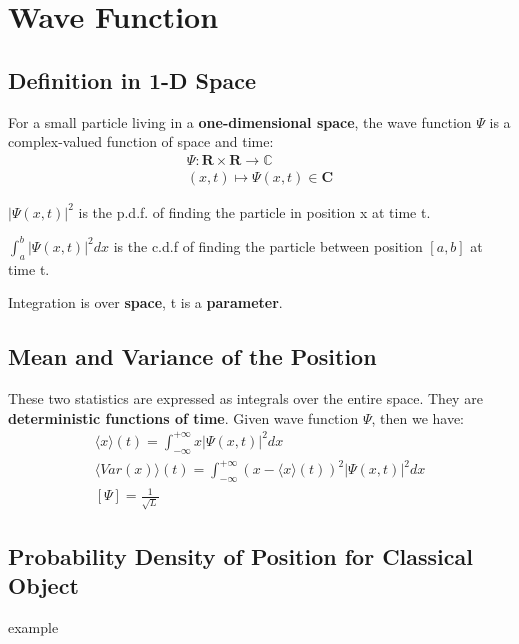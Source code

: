 \section{Wave Function}
\subsection{Definition in 1-D Space}
\begin{definition}
    For a small particle living in a \textbf{{one-dimensional space}}, the wave function $\Psi$ is a complex-valued function of space and time:
    $$
        \begin{gathered}
            \Psi: \mathbf{R} \times \mathbf{R} \rightarrow \mathbb{C} \\
            (x, t) \mapsto \Psi(x, t) \in \mathbf{C}
        \end{gathered}
    $$
\end{definition}

\begin{remark}
    $
        |\Psi(x,t)|^2
    $
    is the p.d.f. of finding the particle in position x at time t.
\end{remark}
\begin{remark}
    $
        \int_{a}^{b} |\Psi(x,t)|^2 dx
    $
    is the c.d.f of finding the particle between position $[a, b]$ at time t.
\end{remark}
\begin{remark}
    Integration is over \textbf{space}, t is a \textbf{parameter}.
\end{remark}
\newpage
\subsection{Mean and Variance of the Position}
These two statistics are expressed as integrals over the entire space. They are \textbf{deterministic functions of time}. Given wave function $\Psi$, then we have: 
$$
\begin{gathered}
    \langle x\rangle(t)=\int_{-\infty}^{+\infty} x|\Psi(x, t)|^{2} d x\\
    \langle Var(x)\rangle(t)=\int_{-\infty}^{+\infty}(x-\langle x\rangle(t))^{2}|\Psi(x, t)|^{2} d x\\
    [\Psi] = \frac{1}{\sqrt{L}}
\end{gathered}
$$

\subsection{Probability Density of Position for Classical Object}
example
